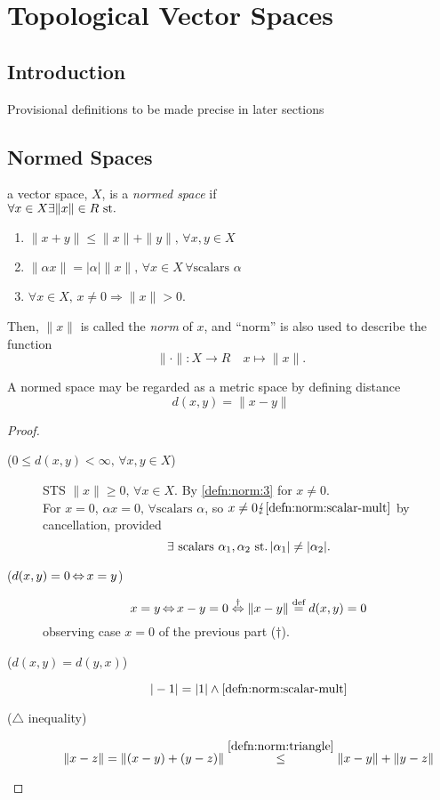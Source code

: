 \chapter{Topological Vector Spaces}

\section{Introduction}
Provisional definitions to be made precise in later sections

\section{Normed Spaces}
\begin{defn}
  a vector space, $X$, is a \emph{normed space} if \\
  ${\forall x\in X\exists \|x\|\in R\operatorname{\,st.}}$
  \begin{enumerate}[label=(\alph*)]
  \item\label{defn:norm:1}\label{defn:norm:triangle}
    ${\|x+y\|\leq\|x\|+\|y\|,\,\forall x,y\in X}$
  \item\label{defn:norm:2}\label{defn:norm:scalar-mult}
    ${\|\alpha x\|=|\alpha|\|x\|,\,\forall x\in X\,\forall\text{scalars }\alpha}$
  \item\label{defn:norm:3}
    ${\forall x\in X,\, x\neq 0\Rightarrow \|x\|>0}$.
  \end{enumerate}
  Then, ${\|x\|}$ is called the \emph{norm} of $x$, and
  ``norm'' is also used to describe the function
  \[ \|\cdot\|: X\rightarrow R\quad x\mapsto\|x\| . \]
\end{defn}

\begin{rem}{}
  A normed space may be regarded as a metric space by
  defining distance
  \[ d(x, y) = \|x-y\| \]
\end{rem}
\begin{proof}\
  \begin{description}
  \item[(${0\leq d(x,y)<\infty,\,\forall x,y\in X}$)]
    STS ${\|x\|\geq 0,\,\forall x\in X}$.
    By \ref{defn:norm:3} for ${x\neq 0}$. \\
    For ${x=0}$,
    ${\alpha x = 0,\,\forall\text{scalars }\alpha}$,
    so ${x\neq 0\lightning\ref{defn:norm:scalar-mult}}$
    by cancellation, provided
    \[
    \exists\text{ scalars }\alpha_1,\alpha_2 \operatorname{\,st.} |\alpha_1|\neq|\alpha_2|.
    \]
  \item[(${d(x,y)=0\operatorname{\Leftrightarrow} x=y}$)]
    \[
    x=y \operatorname{\Leftrightarrow} x - y = 0 \stackrel{\dag}{\operatorname{\Leftrightarrow}}
    \|x-y\|\stackrel{\text{def}}{=} d(x,y) = 0
    \]
    observing case ${x=0}$ of the previous part ($\dag$).
  \item[(${d(x,y)=d(y,x)}$)]
    \[ |-1| = |1|\land\ref{defn:norm:scalar-mult} \]
  \item[($\triangle$ inequality)]
    \[
    \|x-z\| = \|(x-y)+(y-z)\|\stackrel{\ref{defn:norm:triangle}}{\leq}
    \|x-y\|+\|y-z\|
    \]
  \end{description}
\end{proof}

